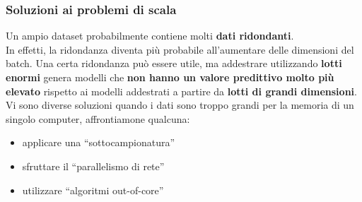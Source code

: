 \begin{frame}
	
	\frametitle{Soluzioni ai problemi di scala}
	
		Un ampio dataset probabilmente contiene molti \textbf{dati ridondanti}.\\
		In effetti, la ridondanza diventa più probabile all'aumentare delle dimensioni del batch.
		\newlinedouble
		Una certa ridondanza può essere utile, ma addestrare utilizzando \textbf{lotti enormi} genera modelli che \textbf{non hanno un valore predittivo molto più elevato} rispetto ai modelli addestrati a partire da \textbf{lotti di grandi dimensioni}.
		\newlinedouble
		Vi sono diverse soluzioni quando i dati sono troppo grandi per la memoria di un singolo computer, affrontiamone qualcuna:
		\begin{itemize}
			\item applicare una {\color{GradientDescentDiagramBlue}``sottocampionatura''}
			\item sfruttare il {\color{GradientDescentDiagramRed}``parallelismo di rete''}
			\item utilizzare {\color{GradientDescentDiagramGreen}``algoritmi out-of-core''}
		\end{itemize}

\end{frame}


